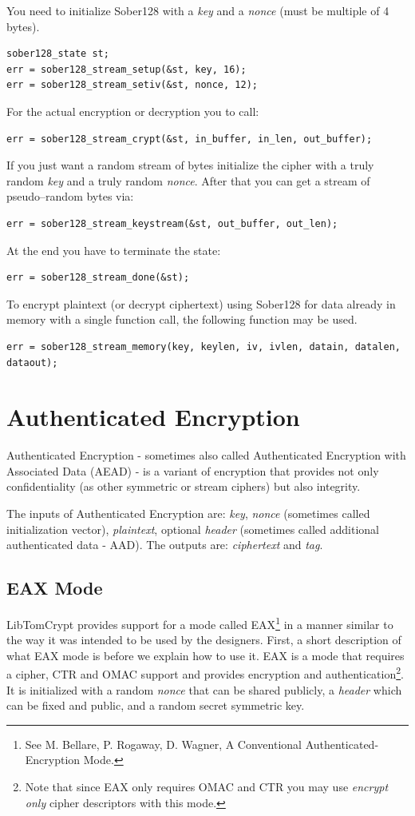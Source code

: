 \documentclass[synpaper]{book}
\newcommand{\mysection}[1]    %
	{                   %
	\section{#1}
   \markboth{\textsf{www.libtom.net}}{\thesection ~ {#1}}
	}
\begin{document}
You need to initialize Sober128 with a \textit{key} and a \textit{nonce} (must be multiple of 4 bytes).
\begin{verbatim}
sober128_state st;
err = sober128_stream_setup(&st, key, 16);
err = sober128_stream_setiv(&st, nonce, 12);
\end{verbatim}

For the actual encryption or decryption you to call:
\begin{verbatim}
err = sober128_stream_crypt(&st, in_buffer, in_len, out_buffer);
\end{verbatim}

If you just want a random stream of bytes initialize the cipher with a truly random \textit{key}
and a truly random \textit{nonce}. After that you can get a stream of pseudo--random bytes via:
\begin{verbatim}
err = sober128_stream_keystream(&st, out_buffer, out_len);
\end{verbatim}

At the end you have to terminate the state:
\begin{verbatim}
err = sober128_stream_done(&st);
\end{verbatim}

To encrypt plaintext (or decrypt ciphertext) using Sober128 for data already in
memory with a single function call, the following function may be used.
\begin{verbatim}
err = sober128_stream_memory(key, keylen, iv, ivlen, datain, datalen, dataout);
\end{verbatim}

\chapter{Authenticated Encryption}

Authenticated Encryption - sometimes also called Authenticated Encryption with Associated Data (AEAD) - is a variant of encryption
that provides not only confidentiality (as other symmetric or stream ciphers) but also integrity.

The inputs of Authenticated Encryption are: \textit{key}, \textit{nonce} (sometimes called initialization vector), \textit{plaintext},
optional \textit{header} (sometimes called additional authenticated data - AAD). The outputs are: \textit{ciphertext} and \textit{tag}.

\mysection{EAX Mode}
LibTomCrypt provides support for a mode called EAX\footnote{See
M. Bellare, P. Rogaway, D. Wagner, A Conventional Authenticated-Encryption Mode.} in a manner similar to the way it was intended to be used
by the designers.  First, a short description of what EAX mode is before we explain how to use it.  EAX is a mode that requires a cipher,
CTR and OMAC support and provides encryption and
authentication\footnote{Note that since EAX only requires OMAC and CTR you may use \textit{encrypt only} cipher descriptors with this mode.}.
It is initialized with a random \textit{nonce} that can be shared publicly, a \textit{header} which can be fixed and public, and a random secret symmetric key.
\end{document}
